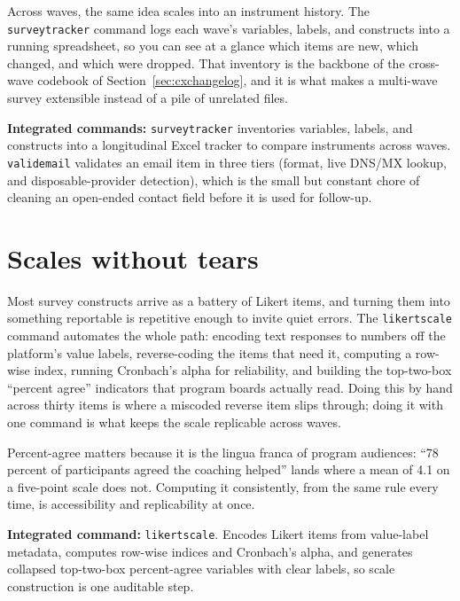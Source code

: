 \documentclass[
    a4paper,
    fontsize=10pt,
    twoside=true,
    numbers=noenddot,
]{kaobook}
\begin{document}
Across waves, the same idea scales into an instrument history. The \texttt{surveytracker} command logs each wave's variables, labels, and constructs into a running spreadsheet, so you can see at a glance which items are new, which changed, and which were dropped. That inventory is the backbone of the cross-wave codebook of Section~\ref{sec:cxchangelog}, and it is what makes a multi-wave survey extensible instead of a pile of unrelated files.

\begin{kaobox}[frametitle=Package Integration: \texttt{surveytracker} and \texttt{validemail}]
\textbf{Integrated commands:} \texttt{surveytracker} inventories variables, labels, and constructs into a longitudinal Excel tracker to compare instruments across waves. \texttt{validemail} validates an email item in three tiers (format, live DNS/MX lookup, and disposable-provider detection), which is the small but constant chore of cleaning an open-ended contact field before it is used for follow-up.
\end{kaobox}

\section{Scales without tears}
Most survey constructs arrive as a battery of Likert items, and turning them into something reportable is repetitive enough to invite quiet errors. The \texttt{likertscale} command automates the whole path: encoding text responses to numbers off the platform's value labels, reverse-coding the items that need it, computing a row-wise index, running Cronbach's alpha for reliability, and building the top-two-box \enquote{percent agree} indicators that program boards actually read. Doing this by hand across thirty items is where a miscoded reverse item slips through; doing it with one command is what keeps the scale replicable across waves.

Percent-agree matters because it is the lingua franca of program audiences: \enquote{78 percent of participants agreed the coaching helped} lands where a mean of 4.1 on a five-point scale does not. Computing it consistently, from the same rule every time, is accessibility and replicability at once.

\begin{kaobox}[frametitle=Package Integration: \texttt{likertscale}]
\textbf{Integrated command:} \texttt{likertscale}. Encodes Likert items from value-label metadata, computes row-wise indices and Cronbach's alpha, and generates collapsed top-two-box percent-agree variables with clear labels, so scale construction is one auditable step.
\end{kaobox}
\end{document}
